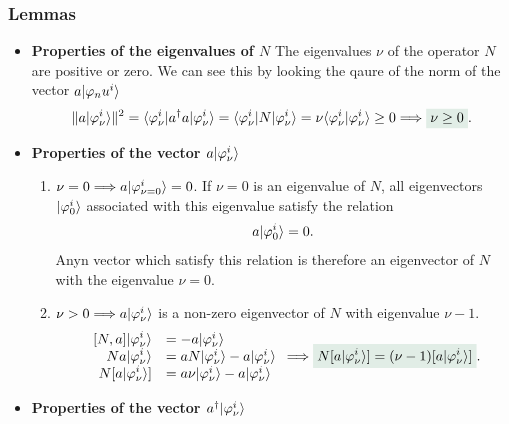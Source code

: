 \subsubsection{Lemmas}
\begin{itemize}[itemsep=0pt,topsep=0pt]
    \item\textbf{Properties of the eigenvalues of $N$} The eigenvalues $\nu$ of the operator $N$ are positive or zero. 
    We can see this by looking the qaure of the norm of the vector $a|\varphi_nu^i\rangle$
    \begin{align*}
        \|a\ket{\varphi_\nu^i}\|^2=\braket{\varphi_\nu^i|a^\dagger a|\varphi_\nu^i}=\braket{\varphi_\nu^i|N|\varphi_\nu^i}=\nu\braket{\varphi_\nu^i|\varphi_\nu^i}\geq0\Longrightarrow\highlight{\nu\geq0}.
    \end{align*}
    \item\textbf{Properties of the vector $a|\varphi_\nu^i\rangle$} 
    \begin{enumerate}[itemsep=0pt,topsep=0pt,label=\roman*)]
        \item $\nu=0\Longrightarrow a|\varphi_{\nu=0}^i\rangle=0$.
        If $\nu=0$ is an eigenvalue of $N$, all eigenvectors $|\varphi_0^i\rangle$ associated with this eigenvalue satisfy the relation 
        \begin{align}
            a|\varphi_0^i\rangle=0.
        \end{align}
        Anyn vector which satisfy this relation is therefore an eigenvector of $N$ with the eigenvalue $\nu=0$.
        \item $\nu>0\Longrightarrow a|\varphi_\nu^i\rangle$ is a non-zero eigenvector of $N$ with eigenvalue $\nu-1$.
        \begin{align*}
            \begin{array}{rl}
            \displaystyle[N,a]\ket{\varphi_\nu^i}&=-a\ket{\varphi_\nu^i}\\
            \displaystyle Na\ket{\varphi_\nu^i}&=aN\ket{\varphi_\nu^i}-a\ket{\varphi_\nu^i}\\
            \displaystyle N[a\ket{\varphi_\nu^i}]&=a\nu\ket{\varphi_\nu^i}-a\ket{\varphi_\nu^i}
            \end{array}\Longrightarrow
            \highlight{N[a\ket{\varphi_\nu^i}]=(\nu-1)[a\ket{\varphi_\nu^i}]}.
        \end{align*}
    \end{enumerate}
    \item\textbf{Properties of the vector $a^\dagger|\varphi_\nu^i\rangle$}
    \begin{enumerate}[itemsep=0pt,topsep=0pt,label=\roman*)]

\end{enumerate}
\end{itemize}
